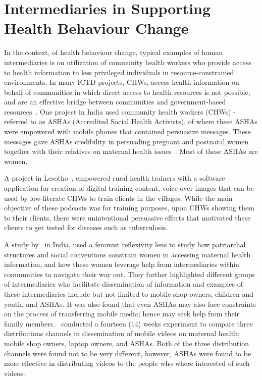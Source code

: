 \section{Intermediaries in Supporting Health Behaviour Change}
In the context, of health behaviour change, typical examples of human intermediaries is on utilization of community health workers who provide access to health information to less privileged individuals in resource-constrained environments.  In many ICTD projects, CHWs, access health information on behalf of communities in which direct access to health resources is not possible, and are an effective bridge between communities and government-based resources~\citep{katule2016leveraging}. One project in India used community health workers (CHWs) -referred to as  ASHAs (Accredited Social Health Activists), of where these ASHAs were empowered with mobile phones that contained persuasive messages. These messages gave ASHAs credibility in persuading pregnant and postnatal women together with their relatives on maternal health issues~\citep{ramachandran2010mobile,ramachandran2010research}. Most of these ASHAs are women.

A project in Lesotho~\citep{molapo2013software}, empowered rural health trainers with a software application for creation of digital  training  content, voice-over images  that can be used by low-literate CHWs to train clients in the villages. While the main objective of these podcasts was for training purposes, upon CHWs showing them to their clients, there were unintentional persuasive effects that motivated these clients to get tested for diseases such as tuberculosis.

A study by~\cite{kumar2015mobile} in India, used a feminist reflexivity lens to study how patriarchal structures and social conventions constrain women in accessing maternal health information, and how these women leverage help from intermediaries within communities to navigate their way out. They further highlighted different groups of intermediaries who facilitate dissemination of information and examples of these intermediaries include but not limited to mobile shop owners, children and youth, and ASHAs.  It was also found that even ASHAs may also face constraints on the process of transferring mobile media; hence may seek help from their family members.~\cite{vashistha2016mobile} conducted a fourteen (14) weeks experiment to compare three distributions channels in dissemination of mobile videos on maternal health; mobile shop owners, laptop owners, and ASHAs. Both of the three distribution channels were found not to be very different, however, ASHAs were found to be more effective in distributing videos to the people who where interested of such videos.

